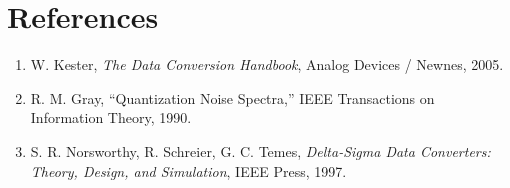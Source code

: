 \documentclass[10pt,journal,compsoc]{IEEEtran}
\begin{document}
\section*{References}
\begin{small}
\begin{enumerate}
    \item W. Kester, \textit{The Data Conversion Handbook}, Analog Devices / Newnes, 2005.
    \item R. M. Gray, ``Quantization Noise Spectra,'' IEEE Transactions on Information Theory, 1990.
    \item S. R. Norsworthy, R. Schreier, G. C. Temes, \textit{Delta-Sigma Data Converters: Theory, Design, and Simulation}, IEEE Press, 1997.
\end{enumerate}
\end{small}
\end{document}

